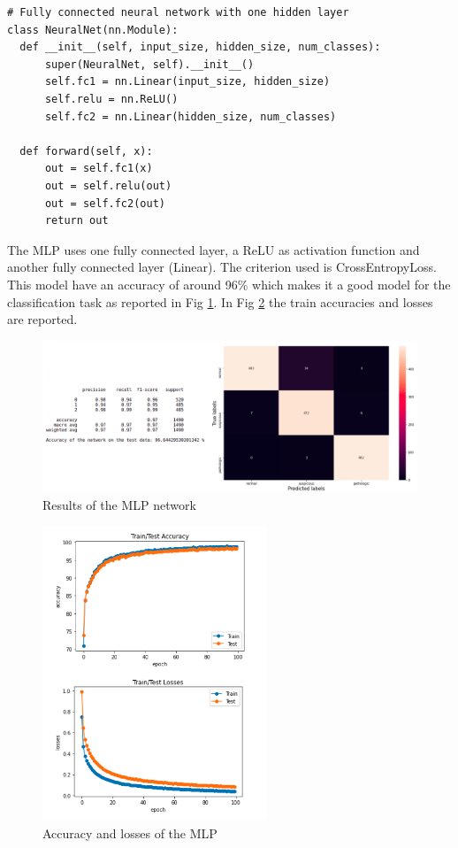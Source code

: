 \documentclass[a4paper,12pt]{article}
\begin{document}
\begin{Verbatim}[fontsize=\small]
# Fully connected neural network with one hidden layer
class NeuralNet(nn.Module):
  def __init__(self, input_size, hidden_size, num_classes):
      super(NeuralNet, self).__init__()
      self.fc1 = nn.Linear(input_size, hidden_size) 
      self.relu = nn.ReLU()
      self.fc2 = nn.Linear(hidden_size, num_classes)  
  
  def forward(self, x):
      out = self.fc1(x)
      out = self.relu(out)
      out = self.fc2(out)
      return out
\end{Verbatim}

\noindent The MLP uses one fully connected layer, a ReLU as activation function and another fully connected layer (Linear). The criterion used is CrossEntropyLoss. This model have an accuracy of around 96\% which makes it a good model for the classification task as reported in Fig \ref{fig:annres}. In Fig \ref{fig:anntrain} the train accuracies and losses are reported.

\begin{figure}[H]
  \begin{center}
  \includegraphics[width=1.0\textwidth]{images/ann_res.png}
  \end{center}
  \caption{Results of the MLP network}
  \label{fig:annres}
\end{figure}


\begin{figure}[H]
  \begin{center}
  \includegraphics[width=0.6\textwidth]{images/ann_train.png}
  \end{center}
  \caption{Accuracy and losses of the MLP}
  \label{fig:anntrain}
\end{figure}
\end{document}
